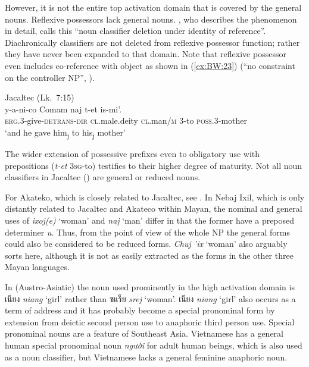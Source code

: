 \documentclass[output=collectionpaper]{langsci/langscibook}
\begin{document}
However, it is not the entire top activation domain that is covered by the general nouns. Reflexive possessors lack general nouns. \citet[159]{Craig1977}, who describes the phenomenon in detail, calls this “noun classifier deletion under identity of reference”. Diachronically classifiers are not deleted from reflexive possessor function; rather they have never been expanded to that domain. Note that reflexive possessor even includes co-reference with object as shown in (\ref{ex:BW:23}) (“no constraint on the controller NP”, \citealt[152]{Craig1977}).

\eas\label{ex:BW:23}
Jacaltec (Lk.~7:15)\\
\gll y-a-ni-co	Comam	naj	t-et	is-mi'.\\
\textsc{erg}.3-give-\textsc{detrans-dir}	\textsc{cl}.male.deity	\textsc{cl}.man/\textsc{m}	3-to	\textsc{poss}.3-mother\\
\glt ‘and he gave him\textsubscript{j} to his\textsubscript{j} mother’\\
\zs

The wider extension of possessive prefixes even to obligatory use with prepositions (\textit{t-et} \textsc{3sg}-to) testifies to their higher degree of maturity. Not all noun classifiers in Jacaltec (\citealt[125]{Day1973}) are general or reduced nouns.

For Akateko, which is closely related to Jacaltec, see \citet{Zavala1992}. In Nebaj Ixil, which is only distantly related to Jacaltec and Akateco within Mayan, the nominal and general uses of \textit{ixoj(e)} ‘woman’ and \textit{naj} ‘man’ differ in that the former have a preposed determiner \textit{u}. Thus, from the point of view of the whole NP the general forms could also be considered to be reduced forms. \textit{Chuj 'ix} ‘woman’ also arguably sorts here, although it is not as easily extracted as the forms in the other three Mayan languages.

In  (Austro-Asiatic) the noun used prominently in the high activation domain is \textkhmer{เนียง}  \textit{niang} ‘girl’ rather than \textkhmer{ซแร็ย}  \textit{srej} ‘woman’. \textkhmer{เนียง }\textit{niang} ‘girl’ also occurs as a term of address and it has probably become a special pronominal form by extension from deictic second person use to anaphoric third person use. Special pronominal nouns are a feature of Southeast Asia. Vietnamese has a general human special pronominal noun \textit{người} for adult human beings, which is also used as a noun classifier, but Vietnamese lacks a general feminine anaphoric noun.
\end{document}
